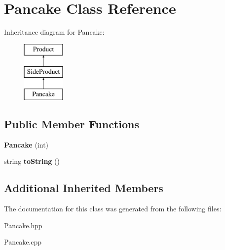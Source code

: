 \hypertarget{class_pancake}{}\section{Pancake Class Reference}
\label{class_pancake}
Inheritance diagram for Pancake\+:\begin{figure}[H]
\begin{center}
\leavevmode
\includegraphics[height=3.000000cm]{class_pancake}
\end{center}
\end{figure}
\subsection*{Public Member Functions}
\begin{DoxyCompactItemize}
\item 
\mbox{\label{class_pancake_a6152169c071413d35349ac63fd339499}} 
{\bfseries Pancake} (int)
\item 
\mbox{\label{class_pancake_a27fbdafb6754dd54eafef5e03e946b9f}} 
string {\bfseries to\+String} ()
\end{DoxyCompactItemize}
\subsection*{Additional Inherited Members}


The documentation for this class was generated from the following files\+:\begin{DoxyCompactItemize}
\item 
Pancake.\+hpp\item 
Pancake.\+cpp\end{DoxyCompactItemize}
